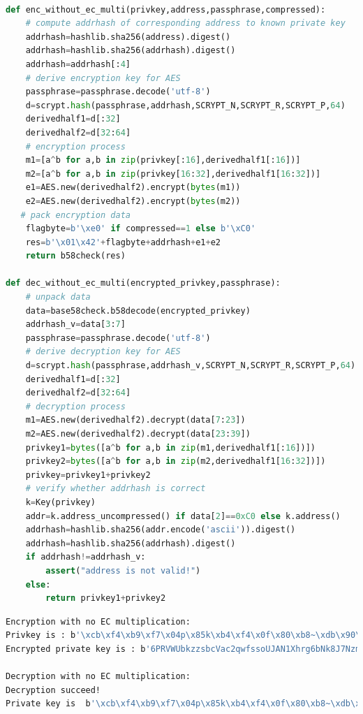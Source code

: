 \begin{lstlisting}[language=python, caption = Encryption \& Decryption with no EC multiplication,
 label=lst-baddersig]

def enc_without_ec_multi(privkey,address,passphrase,compressed):
	# compute addrhash of corresponding address to known private key
	addrhash=hashlib.sha256(address).digest()
	addrhash=hashlib.sha256(addrhash).digest()
	addrhash=addrhash[:4]
	# derive encryption key for AES
	passphrase=passphrase.decode('utf-8')
	d=scrypt.hash(passphrase,addrhash,SCRYPT_N,SCRYPT_R,SCRYPT_P,64)
	derivedhalf1=d[:32]
	derivedhalf2=d[32:64]
	# encryption process
	m1=[a^b for a,b in zip(privkey[:16],derivedhalf1[:16])]
	m2=[a^b for a,b in zip(privkey[16:32],derivedhalf1[16:32])]
	e1=AES.new(derivedhalf2).encrypt(bytes(m1))
	e2=AES.new(derivedhalf2).encrypt(bytes(m2))
   # pack encryption data
	flagbyte=b'\xe0' if compressed==1 else b'\xC0'
	res=b'\x01\x42'+flagbyte+addrhash+e1+e2
	return b58check(res)
	
def dec_without_ec_multi(encrypted_privkey,passphrase):
	# unpack data 
	data=base58check.b58decode(encrypted_privkey)
	addrhash_v=data[3:7]
	passphrase=passphrase.decode('utf-8')
	# derive decryption key for AES
	d=scrypt.hash(passphrase,addrhash_v,SCRYPT_N,SCRYPT_R,SCRYPT_P,64)
	derivedhalf1=d[:32]
	derivedhalf2=d[32:64]
	# decryption process
	m1=AES.new(derivedhalf2).decrypt(data[7:23])
	m2=AES.new(derivedhalf2).decrypt(data[23:39])
	privkey1=bytes([a^b for a,b in zip(m1,derivedhalf1[:16])])
	privkey2=bytes([a^b for a,b in zip(m2,derivedhalf1[16:32])])
	privkey=privkey1+privkey2
	# verify whether addrhash is correct
	k=Key(privkey)
	addr=k.address_uncompressed() if data[2]==0xC0 else k.address()
	addrhash=hashlib.sha256(addr.encode('ascii')).digest()
	addrhash=hashlib.sha256(addrhash).digest()
	if addrhash!=addrhash_v:
		assert("address is not valid!")
	else:
		return privkey1+privkey2
\end{lstlisting}

\begin{lstlisting}[language=bash, caption = 测试结果 label=lst-baddersig]
Encryption with no EC multiplication:
Privkey is : b'\xcb\xf4\xb9\xf7\x04p\x85k\xb4\xf4\x0f\x80\xb8~\xdb\x90\x86Y\x97\xff\xeem\xf3\x15\xab\x16mq:\xf43\xa5'
Encrypted private key is : b'6PRVWUbkzzsbcVac2qwfssoUJAN1Xhrg6bNk8J7Nzm5H7kxEbn2Nh2ZoGg'

Decryption with no EC multiplication:
Decryption succeed!
Private key is  b'\xcb\xf4\xb9\xf7\x04p\x85k\xb4\xf4\x0f\x80\xb8~\xdb\x90\x86Y\x97\xff\xeem\xf3\x15\xab\x16mq:\xf43\xa5'
\end{lstlisting}

